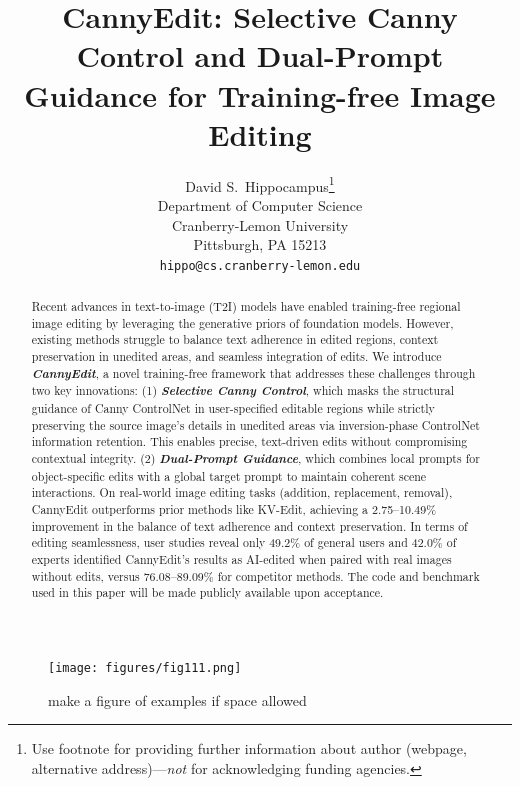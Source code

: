 \documentclass{article}
\title{CannyEdit: Selective Canny Control and Dual-Prompt Guidance for Training-free Image Editing}
\author{%
  David S.~Hippocampus\thanks{Use footnote for providing further information
    about author (webpage, alternative address)---\emph{not} for acknowledging
    funding agencies.} \\
  Department of Computer Science\\
  Cranberry-Lemon University\\
  Pittsburgh, PA 15213 \\
  \texttt{hippo@cs.cranberry-lemon.edu} \\
}
\begin{document}
\maketitle


\begin{abstract}
Recent advances in text-to-image (T2I) models have enabled training-free regional image editing by leveraging the generative priors of foundation models. However, existing methods struggle to balance text adherence in edited regions, context preservation in unedited areas, and seamless integration of edits. We introduce \textbf{\textit{CannyEdit}}, a novel training-free framework that addresses these challenges through two key innovations: (1) \textbf{\textit{Selective Canny Control}}, which masks the structural guidance of Canny ControlNet in user-specified editable regions while strictly preserving the source image’s details in unedited areas via inversion-phase ControlNet information retention. This enables precise, text-driven edits without compromising contextual integrity. (2) \textbf{\textit{Dual-Prompt Guidance}}, which combines local prompts for object-specific edits with a global target prompt to maintain coherent scene interactions. On real-world image editing tasks (addition, replacement, removal), CannyEdit outperforms prior methods like KV-Edit, achieving a 2.75–10.49\% improvement in the balance of text adherence and context preservation. In terms of editing seamlessness, user studies reveal only 49.2\% of general users and 42.0\% of experts identified CannyEdit's results as AI-edited when paired with real images without edits, versus 76.08–89.09\% for competitor methods. The code and benchmark used in this paper will be made publicly available upon acceptance.
\end{abstract}



\begin{figure}[h!]
    \centering
    \texttt{[image: figures/fig111.png]}
    \caption{make a figure of examples if space allowed}
    \label{fig11}
\end{figure}






%
%
\end{document}

